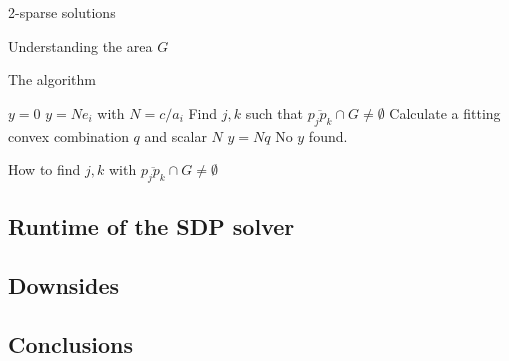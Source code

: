 \begin{frame}{2-sparse solutions}

\end{frame}

\begin{frame}{Understanding the area $G$}

\end{frame}

\begin{frame}{The algorithm}
\begin{algorithmic}
    \State \Return $y=0$
    \pause
{}
    \State \Return $y=Ne_i$ with $N=c/a_i$
    \pause
\Else
	\State Find $j,k$ such that $\overline{p_j p_k}\cap G\neq \emptyset$
		\State Calculate a fitting convex combination $q$ and scalar $N$
		\State \Return $y=Nq$
	\Else
		\State \Return	No $y$ found.
	\EndIf
\EndIf
\end{algorithmic}
\end{frame}

\begin{frame}{How to find $j,k$ with $\overline{p_j p_k}\cap G\neq \emptyset$}

\end{frame}

\subsection{Runtime of the SDP solver}

\subsection{Downsides}

\subsection{Conclusions}